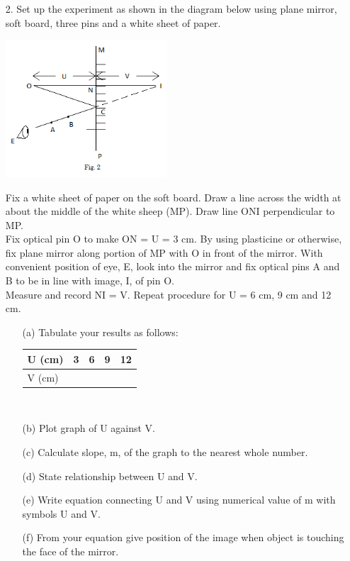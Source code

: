 \begin{enumerate}
\item[2.] Set up the experiment as shown in the diagram below using plane mirror, soft board, three pins and a white sheet of paper.

\begin{center}
\includegraphics[width=6cm]{./img/2006-2-alt.png}
\end{center}

Fix a white sheet of paper on the soft board. Draw a line across the width at about the middle of the white sheep (MP). Draw line ONI perpendicular to MP.\\

Fix optical pin O to make ON = U = 3 cm. By using plasticine or otherwise, fix plane mirror along portion of MP with O in front of the mirror. With convenient position of eye, E, look into the mirror and fix optical pins A and B to be in line with image, I, of pin O.\\

Measure and record NI = V. Repeat procedure for U = 6 cm, 9 cm and 12 cm.

\begin{itemize}
\item[(a)] Tabulate your results as follows:\\[10pt]

\quad \quad \begin{tabular}{|l|c|c|c|c|} \hline
U (cm) &3&6&9&12 \\ \hline
V (cm) &&&& \\ \hline
\end{tabular} \\[10pt]

\item[(b)] Plot graph of U against V.
\item[(c)] Calculate slope, m, of the graph to the nearest whole number.
\item[(d)] State relationship between U and V.
\item[(e)] Write equation connecting U and V using numerical value of m with symbols U and V.
\item[(f)] From your equation give position of the image when object is touching the face of the mirror.
\end{itemize}

\end{enumerate}



